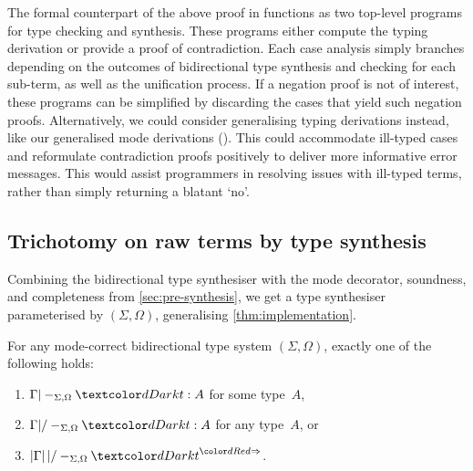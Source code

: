 The formal counterpart of the above proof in \Agda functions as two top-level programs for type checking and synthesis.
These programs either compute the typing derivation or provide a proof of contradiction.
Each case analysis simply branches depending on the outcomes of bidirectional type synthesis and checking for each sub-term, as well as the unification process.
If a negation proof is not of interest, these programs can be simplified by discarding the cases that yield such negation proofs.
Alternatively, we could consider generalising typing derivations instead, like our generalised mode derivations ().
This could accommodate ill-typed cases and reformulate contradiction proofs positively to deliver more informative error messages.
This would assist programmers in resolving issues with ill-typed terms, rather than simply returning a blatant `no'.

\subsection{Trichotomy on raw terms by type synthesis} \label{subsec:trichotomy}

Combining the bidirectional type synthesiser with the mode decorator, soundness, and completeness from \cref{sec:pre-synthesis}, we get a type synthesiser parameterised by $(\Sigma, \Omega)$, generalising \cref{thm:implementation}.

\begin{corollary}\label{cor:trichotomy}
  For any mode-correct bidirectional type system $(\Sigma, \Omega)$, 
  exactly one of the following holds:
  \begin{enumerate}
    \item $\Gamma |-_{\Sigma, \Omega} \isTerm{t} : A$ for some type~$A$,
    \item $\Gamma |/-_{\Sigma, \Omega} \isTerm{t} : A$ for any type~$A$, or 
    \item $\erase{\Gamma} |/-_{\Sigma, \Omega} \isTerm{t}^{\syn}$.
  \end{enumerate}
\end{corollary}

